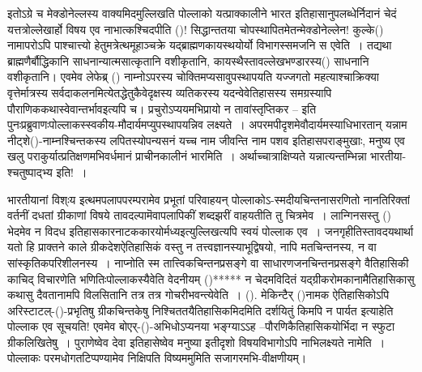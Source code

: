 इतोऽग्रे च मेक्डोनेल्लस्य वाक्यमिदमुल्लिखति पोल्लाको यत्प्राक्कालीने भारत इतिहासानुपलब्धेर्निदानं चेदं यत्तत्रोल्लेखार्हो विषय एव नाभात्कश्चिदपीति ()! सिद्धान्ततया चोपस्थापितमेतन्मेक्डोनेल्लेन! कुल्के() नामापरोऽपि पाश्चात्त्यो हेतुमत्रेत्थमूहाञ्चक्रे यद्ब्राह्मणकायस्थयोर्यो विभागस्समजनि स एवेति~। तद्यथा ब्राह्मणैर्बौद्धिकानि साधनान्यात्मसात्कृतानि वशीकृतानि, कायस्थैस्तावल्लेखभण्डारस्य() साधनानि वशीकृतानि। एवमेव लेफेब्र् () नाम्नोऽपरस्य चोक्तिमप्यसावुपस्थापयति यज्जगतो महत्याश्चाक्रिक्या वृत्तेर्मात्रस्य सर्वदाकलनमित्येतद्धेतुकैवेदृक्षस्य व्यतिकरस्य यदन्वेवेतिहासस्य समग्रस्यापि पौराणिककथास्वेवान्तर्भाव\break इत्यपि च। प्रचुरोऽप्ययमभिप्रायो न तावांस्तृप्तिकर – इति पुनःप्रब्रुवाणःपोल्लाकस्स्वकीय-\break मौदार्यमप्युपस्थापयन्निव लक्ष्यते~। अपरमपीदृशमेवौदार्यमस्याधिभारतान् यन्नाम नीट्शे\break ()-नाम्नश्चिन्तकस्य लपितस्योपन्यसनं यच्च नाम जीवन्ति नाम पशव इतिहासपराङ्मुखाः, मनुष्य एव खलु पराकुर्यात्प्रतिक्षणमभिवर्धमानं प्राचीनकालीनं भारमिति~। अर्थाच्चात्राक्षिप्यते यन्नात्यन्तम्भिन्ना भारतीया-श्चतुष्पाद्भ्य इति!~।

भारतीयानां विश्ःय इत्थमपलापपरम्परामेव प्रभूतां परिवाहयन् पोल्लाकोऽ-स्मदीयचिन्तनासर\-णितो नानतिरिक्तां वर्तनीं दधतां ग्रीकाणां विषये तावदल्पामॆवापलापिकीं शब्दझरीं वाहयतीति तु चित्रमेव~। लान्गिनसस्तु () भेदमेव न विदध इतिहासकारनाटककारयोर्मध्य\break इत्युल्लिखत्यपि स्वयं पोल्लाक एव~। जनगृहीतिस्तावदयथार्था यतो हि प्राक्तने काले ग्रीकदेश\break ऐतिहासिकं वस्तु न तत्त्वज्ञानस्याभूद्विषयो, नापि मतचिन्तनस्य, न वा सांस्कृतिकपरिशीलनस्य~। नाप्नोति स्म तात्त्विकचिन्तनप्रसङ्गे वा साधारणजनचिन्तनप्रसङ्गे वैतिहासिकी काचिद् विचारणेति भणितिःपोल्लाकस्यैवेति वेदनीयम् ()***** न चेदमविदितं यद्ग्रीकरोमकानामैतिहासिकासु कथासु दैवतानामपि विलसितानि तत्र तत्र गोचरीभवन्त्येवेति~। (). मेकिन्टैर् ()नामक ऐतिहासिकोऽपि अरिस्टाटल्-()-प्रभृतिषु ग्रीकचिन्तकेषु निश्चिततयैतिहासिकमिदमिति दर्शयितुं किमपि न पार्यत इत्याहेति पोल्लाक एव सूचयति! एवमेव बोएर्-()-अभिधोऽप्यनया भङ्ग्याऽऽह –\break पौरणिकैतिहासिकयोर्भिदा न स्फुटा ग्रीकलिखितेषु~। पुराणेष्वेव देवा इतिहासेष्वेव मनुष्या इतीदृशो विषयविभागोऽपि नाभिलक्ष्यते नामेति~। पोल्लाकः परमधोगतटिप्पण्यामेव निक्षिपति विष्यममुमिति सजागरमभि-वीक्षणीयम्।

